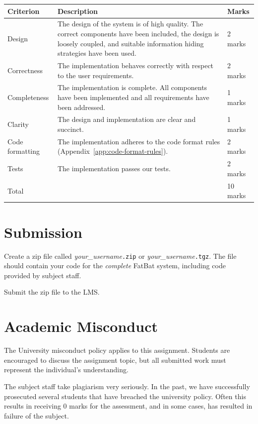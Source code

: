 \documentclass[11pt]{article}
\begin{document}
\begin{center}
\begin{tabular}{lp{10cm}l}
\toprule
 {\bf Criterion} & {\bf Description} & {\bf Marks}\\
\midrule
  Design & The design of the system is of high quality. The correct components have been included, the design is loosely coupled, and suitable information hiding strategies have been used. & 2 marks\\[2mm]
  Correctness & The implementation behaves correctly with respect to the user requirements.   & 2 marks\\[2mm]
  Completeness & The implementation is complete. All components have been implemented and all requirements have been addressed. & 1 marks\\[2mm]
  Clarity & The design and implementation are clear and succinct. & 1 marks\\[2mm]
  Code formatting & The implementation adheres to the code format rules (Appendix~\ref{app:code-format-rules}). & 2 marks\\[2mm]
  Tests & The implementation passes our tests. & 2 marks\\[1mm]
\midrule
  Total && 10 marks\\
\bottomrule
\end{tabular}
\end{center}

\section{Submission}

Create a zip file called  \emph{your\_username}\texttt{.zip} or \emph{your\_username}\texttt{.tgz}. The file should contain your code for the \emph{complete} FatBat system, including code provided by subject staff.

Submit the zip file to the LMS.

\section{Academic Misconduct}

The University misconduct policy applies to this assignment. Students are encouraged to discuss the assignment topic, but all submitted work must represent the individual's understanding.

The subject staff take plagiarism very seriously. In the past, we have successfully prosecuted several students that have breached the university policy. Often this results in receiving 0 marks for the assessment, and in some cases, has resulted in failure of the subject.

\pagebreak

\appendix


\end{document}
